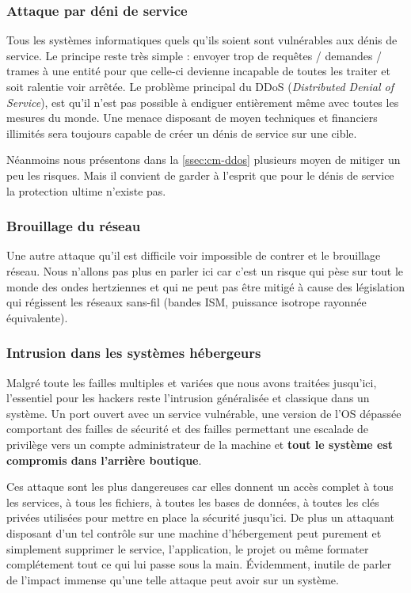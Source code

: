 \subsubsection{Attaque par déni de service}

Tous les systèmes informatiques quels qu'ils soient sont vulnérables aux dénis de service. Le principe reste très simple : envoyer trop de requêtes / demandes / trames à une entité pour que celle-ci devienne incapable de toutes les traiter et soit ralentie voir arrêtée. Le problème principal du DDoS (\emph{Distributed Denial of Service}), est qu'il n'est pas possible à endiguer entièrement même avec toutes les mesures du monde. Une menace disposant de moyen techniques et financiers illimités sera toujours capable de créer un dénis de service sur une cible.

Néanmoins nous présentons dans la \autoref{ssec:cm-ddos} plusieurs moyen de mitiger un peu les risques. Mais il convient de garder à l'esprit que pour le dénis de service la protection ultime n'existe pas.

\subsubsection{Brouillage du réseau}

Une autre attaque qu'il est difficile voir impossible de contrer et le brouillage réseau. Nous n'allons pas plus en parler ici car c'est un risque qui pèse sur tout le monde des ondes hertziennes et qui ne peut pas être mitigé à cause des législation qui régissent les réseaux sans-fil (bandes ISM, puissance isotrope rayonnée équivalente).

\subsubsection{Intrusion dans les systèmes hébergeurs}

Malgré toute les failles multiples et variées que nous avons traitées jusqu'ici, l'essentiel pour les hackers reste l'intrusion généralisée et classique dans un système. Un port ouvert avec un service vulnérable, une version de l'OS dépassée comportant des failles de sécurité et des failles permettant une escalade de privilège vers un compte administrateur de la machine et \textbf{tout le système est compromis dans l'arrière boutique}.

Ces attaque sont les plus dangereuses car elles donnent un accès complet à tous les services, à tous les fichiers, à toutes les bases de données, à toutes les clés privées utilisées pour mettre en place la sécurité jusqu'ici. De plus un attaquant disposant d'un tel contrôle sur une machine d'hébergement peut purement et simplement supprimer le service, l'application, le projet ou même formater complétement tout ce qui lui passe sous la main.  Évidemment, inutile de parler de l'impact immense qu'une telle attaque peut avoir sur un système.


